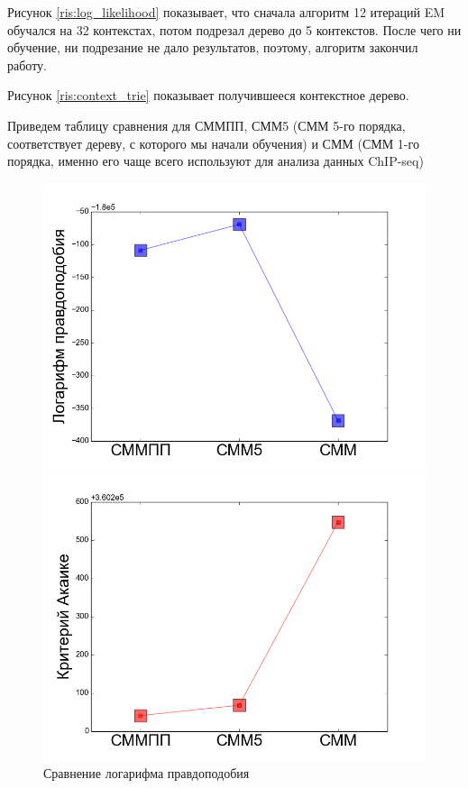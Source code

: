 \documentclass{matmex-diploma-custom}
\begin{document}
Рисунок \ref{ris:log_likelihood} показывает, что сначала алгоритм 12 итераций EM обучался на 32 контекстах, потом подрезал дерево до 5 контекстов. После чего ни обучение, ни подрезание не дало результатов, поэтому, алгоритм закончил работу.

Рисунок \ref{ris:context_trie} показывает получившееся контекстное дерево.

Приведем таблицу сравнения для СММПП, СММ5 (СММ 5-го порядка, соответствует дереву, с которого мы начали обучения) и СММ (СММ 1-го порядка, именно его чаще всего используют для анализа данных ChIP-seq)
\begin{figure}[h!]\centering
\begin{minipage}[b]{0.32 \textwidth}
	\includegraphics[scale=0.28]{img/real/log_p.png}
	\centering
	\caption{ Сравнение логарифма правдоподобия}
	\label{ris:real_comp_log_p}
\end{minipage}
\hfill
\begin{minipage}[b]{0.32 \textwidth}
	\includegraphics[scale=0.28]{img/real/aic.png}

\end{minipage}
\end{figure}
\end{document}
